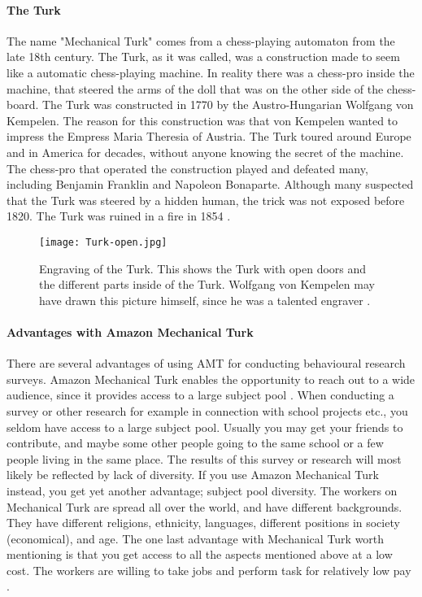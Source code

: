 \paragraph{The Turk}
The name "Mechanical Turk" comes from a chess-playing automaton from the  late 18th century. The Turk, as it was called, was a construction made to seem like a automatic chess-playing machine. In reality there was a chess-pro inside the machine, that steered the arms of the doll that was on the other side of the chess-board. The Turk was constructed in 1770 by the Austro-Hungarian Wolfgang von Kempelen. The reason for this construction was that von Kempelen wanted to impress the Empress Maria Theresia of Austria. 
The Turk toured around Europe and in America for decades, without anyone knowing the secret of the machine. The chess-pro that operated the construction played and defeated many, including Benjamin Franklin and Napoleon Bonaparte. Although many suspected that the Turk was steered by a 
hidden human, the trick was not exposed before 1820. The Turk was ruined in a fire in 1854 \cite{theturk}.

\begin{figure}[h!]
\centering
\texttt{[image: Turk-open.jpg]}
\caption{Engraving of the Turk. This shows the Turk with open doors and the different parts inside of the Turk. Wolfgang von Kempelen may have drawn this picture himself, since he was a talented engraver \cite{theturk}.}
\end{figure}

\paragraph{Advantages with Amazon Mechanical Turk}
There are several advantages of using AMT for conducting behavioural research surveys. Amazon Mechanical Turk enables the opportunity to reach out to a wide audience, since it provides access to a large subject pool \cite{AMT}. When conducting a survey or other research for example in connection with school projects etc., you seldom have access to a large subject pool. Usually you may get your friends to contribute, and maybe some other people going to the same school or a few people living in the same place. The results of this survey or research will most likely be reflected by lack of diversity. If you use Amazon Mechanical Turk instead, you get yet another advantage; subject pool diversity. The workers on Mechanical Turk are spread all over the world, and have different backgrounds. They have different religions, ethnicity, languages, different positions in society (economical), and age. The one last advantage with Mechanical Turk worth mentioning is that you get access to all the aspects mentioned above at a low cost. The workers are willing to take jobs and perform task for relatively low pay \cite{AMT}.

